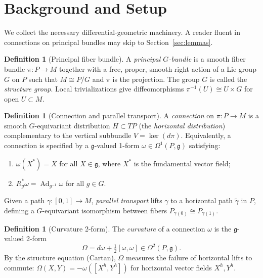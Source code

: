 \documentclass[12pt]{amsart}
\theoremstyle{plain}
\theoremstyle{definition}
\newtheorem{definition}[theorem]{Definition}
\DeclareMathOperator{\Ad}{Ad}
\newcommand{\fg}{\mathfrak{g}}
\begin{document}
\section{Background and Setup}

We collect the necessary differential-geometric machinery. A reader
fluent in connections on principal bundles may skip to
Section~\ref{sec:lemmas}.

\begin{definition}[Principal fiber bundle]
A \emph{principal $G$-bundle} is a smooth fiber bundle $\pi: P \to M$
together with a free, proper, smooth right action of a Lie group $G$ on $P$
such that $M \cong P/G$ and $\pi$ is the projection. The group $G$ is called
the \emph{structure group}. Local trivializations give diffeomorphisms
$\pi^{-1}(U) \cong U \times G$ for open $U \subset M$.
\end{definition}

\begin{definition}[Connection and parallel transport]
A \emph{connection} on $\pi: P \to M$ is a smooth $G$-equivariant
distribution $H \subset TP$ (the \emph{horizontal distribution})
complementary to the vertical subbundle $V = \ker(d\pi)$. Equivalently, a
connection is specified by a $\fg$-valued 1-form $\omega \in
\Omega^1(P,\fg)$ satisfying:
\begin{enumerate}[label=(\roman*)]
  \item $\omega(X^*) = X$ for all $X \in \fg$, where $X^*$ is the
    fundamental vector field;
  \item $R_g^*\omega = \Ad_{g^{-1}} \omega$ for all $g \in G$.
\end{enumerate}
Given a path $\gamma: [0,1] \to M$, \emph{parallel transport} lifts $\gamma$
to a horizontal path $\tilde\gamma$ in $P$, defining a $G$-equivariant
isomorphism between fibers $P_{\gamma(0)} \cong P_{\gamma(1)}$.
\end{definition}

\begin{definition}[Curvature 2-form]
The \emph{curvature} of a connection $\omega$ is the $\fg$-valued 2-form
\[
  \Omega = d\omega + \tfrac{1}{2}[\omega, \omega] \in \Omega^2(P, \fg).
\]
By the structure equation (Cartan), $\Omega$ measures the failure of
horizontal lifts to commute: $\Omega(X,Y) = -\omega([X^h, Y^h])$ for
horizontal vector fields $X^h, Y^h$.
\end{definition}
\end{document}
